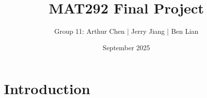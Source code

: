 \documentclass{article}
\title{MAT292 Final Project}
\author{Group 11: Arthur Chen | Jerry Jiang | Ben Lian}
\date{September 2025}
\begin{document}
\maketitle

\section{Introduction}
\end{document}
